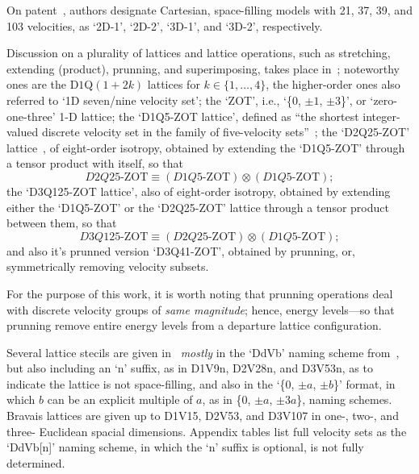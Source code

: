     On patent~\cite{2008-ShanX+ZhangR-USPat}, authors designate Cartesian,  space-filling  models  with  21,  37,  39,  and  103
    velocities, as `2D-1', `2D-2', `3D-1', and `3D-2', respectively.

    Discussion on a plurality of lattices and lattice  operations,  such  as  stretching,  extending  (product),  prunning,  and
    superimposing, takes place in~\cite{2009-ChikatamarlaSS+KarlinIV-PhysRevE}; noteworthy ones are the  D$1$Q$(1+2k)$  lattices
    for $k \in \{1, \ldots, 4\}$, the higher-order ones also referred to `1D seven/nine velocity set'; the `ZOT', i.e.,  `\{$0$,
    $\pm 1$, $\pm 3$\}', or  `zero-one-three'  1-D  lattice;  the  `D1Q5-ZOT  lattice',  defined  as  ``{\swshape  the  shortest
    integer-valued        discrete        velocity        set        in        the        family        of         five-velocity
    sets\/}''~\cite{2006-ChikatamarlaSS+KarlinIV-PhysRevLett};                          the                          `D2Q25-ZOT'
    lattice~\cite{2008-ChikatamarlaSS+KarlinIV-CompPhysComm}, of eight-order isotropy,  obtained  by  extending  the  `D1Q5-ZOT'
    through a tensor product with itself, so that
    \begin{equation}
        D2Q25\mbox{-ZOT} \equiv (D1Q5\mbox{-ZOT}) \otimes (D1Q5\mbox{-ZOT});
    \end{equation}
    \noindent the `D3Q125-ZOT lattice', also of eight-order iso\-tro\-py, obtained by extending either  the  `D1Q5-ZOT'  or  the
    `D2Q25-ZOT' lattice through a tensor product between them, so that
    \begin{equation}
        D3Q125\mbox{-ZOT} \equiv (D2Q25\mbox{-ZOT}) \otimes (D1Q5\mbox{-ZOT});
    \end{equation}
    \noindent and also it's prunned version `D3Q41-ZOT', obtained by prunning, or, symmetrically removing velocity subsets.

    For the purpose of this work, it is worth noting that prunning operations deal with discrete velocity groups  of  \emph{same
    magnitude}; hence, energy levels---so that prunning remove entire energy levels from a departure lattice configuration.

    Several lattice stecils are given in~\cite{2009-SurmasR+PhilippiPC-EurPhysJSpecialTopics} \emph{mostly} in the `DdVb' naming
    scheme from~\cite{2006-PhilippiPC+SurmasR-PhysRevE}, but also including an `n' suffix, as in D1V9n, D2V28n, and  D3V53n,  as
    to indicate the lattice is not space-filling, and also in the `\{$0$, $\pm a$, $\pm b$\}' format, in which  $b$  can  be  an
    explicit multiple of $a$, as in \{$0$, $\pm a$, $\pm 3a$\}, naming schemes. Bravais lattices are given up to  D1V15,  D2V53,
    and D3V107 in one-, two-, and three- Euclidean spacial dimensions. Appendix tables list full velocity sets as the  `DdVb[n]'
    naming scheme, in which the `n' suffix is optional, is not fully determined.

